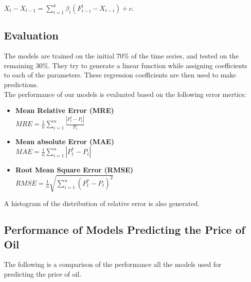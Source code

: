 \documentclass[runningheads]{llncs}
\begin{document}
$X_t - X_{t-1} = \sum\limits_{i=1}^k \beta_i(F_{t-i}^t - X_{t-i}) +c$.


\subsection{Evaluation}

\noindent The models are trained on the initial 70\% of the time series, and tested on the remaining 30\%. They try to generate a linear function while assigning coefficients to each of the parameters. These regression coefficients are then used to make predictions. \\

The performance of our models is evaluated based on the following error mertics:

\begin {itemize}

\item \textbf{Mean Relative Error (MRE)}\\
$MRE = \frac{1}{n}\sum\limits_{i=1}^n \frac{|P^*_{t} - P_{t}|}{P_t}$\\

\item \textbf{Mean absolute Error (MAE)}\\
$MAE = \frac{1}{n}\sum\limits_{i=1}^n |P^*_{t} - P_{t}|$\\

\item \textbf{Root Mean Square Error (RMSE)}\\
$RMSE = \frac{1}{n}\sqrt{\sum\limits_{i=1}^n (P^*_{t} - P_{t})^2}$\\

\end {itemize}

A histogram of the distribution of relative error is also generated.

\subsection{Performance of Models Predicting the Price of Oil}

\noindent The following is a comparison of the performance all the models used for predicting the price of oil.
\end{document}
